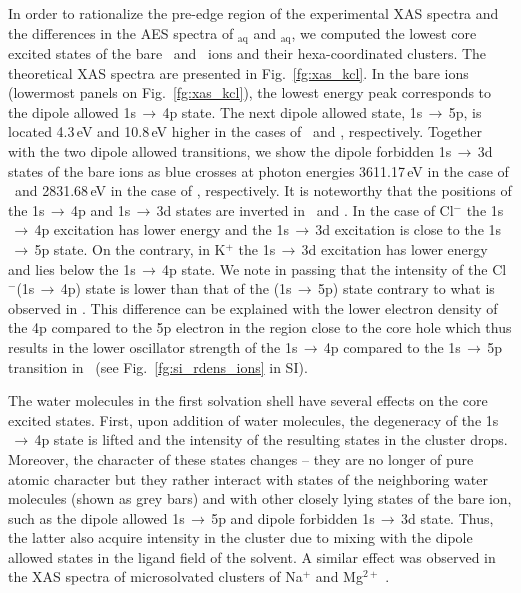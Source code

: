 In order to rationalize the pre-edge region of the experimental XAS spectra and the differences in the AES spectra of \ki$_{\text{aq}}$ and \cli$_{\text{aq}}$, we computed the lowest core excited states of the bare \ki~and \cli~ions and their hexa-coordinated clusters. The theoretical XAS spectra are presented in Fig.\ \ref{fg:xas_kcl}. In the bare ions (lowermost panels on Fig.\ \ref{fg:xas_kcl}), the lowest energy peak corresponds to the dipole allowed 1s$\,\rightarrow\,$4p state. The next dipole allowed state, 1s$\,\rightarrow\,$5p, is located 4.3\,eV and 10.8\,eV higher in the cases of \ki~and \cli, respectively. Together with the two dipole allowed transitions, we show the dipole forbidden 1s$\,\rightarrow\,$3d states of the bare ions as blue crosses at photon energies 3611.17\,eV in the case of \ki~and 2831.68\,eV in the case of \cli, respectively. It is noteworthy that the positions of the 1s$\,\rightarrow\,$4p and 1s$\,\rightarrow\,$3d states are inverted in \ki~and \cli. In the case of Cl$^{-}$ the 1s$\,\rightarrow\,$4p excitation has lower energy and the 1s$\,\rightarrow\,$3d excitation is close to the 1s$\,\rightarrow\,$5p state. On the contrary, in K$^{+}$ the 1s$\,\rightarrow\,$3d excitation has lower energy and lies below the 1s$\,\rightarrow\,$4p state. We note in passing that the intensity of the Cl$^{-}$(1s$\,\rightarrow\,$4p) state is lower than that of the \cli(1s$\,\rightarrow\,$5p) state contrary to what is observed in \ki. This difference can be explained with the lower electron density of the 4p compared to the 5p electron in the region close to the core hole which thus results in the lower oscillator strength of the 1s$\,\rightarrow\,$4p compared to the 1s$\,\rightarrow\,$5p transition in \cli~(see Fig.\ \ref{fg:si_rdens_ions} in SI).


The water molecules in the first solvation shell have several effects on the core excited states. First, upon addition of water molecules, the degeneracy of the 1s$\,\rightarrow\,$4p state is lifted and the intensity of the resulting states in the cluster drops. Moreover, the character of these states changes -- they are no longer of pure atomic character but they rather interact with states of the neighboring water molecules (shown as grey bars) and with other closely lying states of the bare ion, such as the dipole allowed 1s$\,\rightarrow\,$5p and dipole forbidden 1s$\,\rightarrow\,$3d state. Thus, the latter also acquire intensity in the cluster due to mixing with the dipole allowed states in the ligand field of the solvent. A similar effect was observed in the XAS spectra of microsolvated clusters of Na$^{+}$ and Mg$^{2+}$ \citep{miteva16:16671}.


